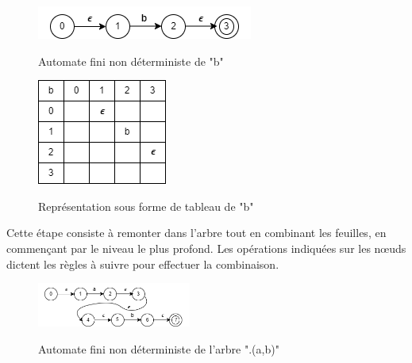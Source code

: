 \documentclass{article}
\begin{document}
\newpage
\begin{figure}[h]
    \begin{minipage}{0.3\textwidth}
        \centering
        \includegraphics[width=\textwidth]{resourse/NDFA_b.png}
        \caption{Automate fini non déterministe de "b"}
        \label{fig:ndfa_b}
        \cite{ndfa_b}
    \end{minipage}
    \hspace{5cm} %
    \begin{minipage}{0.25\textwidth}
        \centering
        \includegraphics[width=\textwidth]{resourse/NDFA_b.tab.png}
        \caption{Représentation sous forme de tableau de "b"}
        \label{fig:ndfa_tab_b}
        \cite{ndfa_tab_b}
    \end{minipage}
\end{figure}

Cette étape consiste à remonter dans l'arbre tout en combinant les feuilles, en commençant par le niveau le plus profond. Les opérations indiquées sur les nœuds dictent les règles à suivre pour effectuer la combinaison.

\begin{figure}[h] %
    \centering
    \includegraphics[width=0.45\textwidth]{./resourse/NDFA_ab.png}
    \caption{Automate fini non déterministe de l'arbre ".(a,b)"}
    \cite{ndfa_ab}
    \label{fig:ndfa_ab}
\end{figure}
\end{document}
